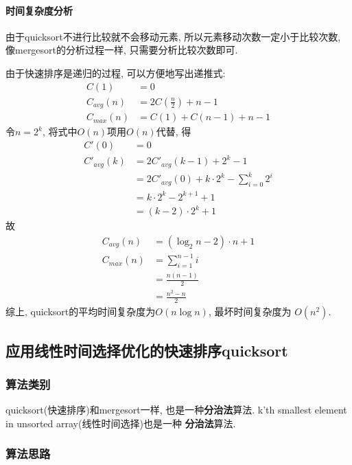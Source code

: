 \paragraph{时间复杂度分析}
由于quicksort不进行比较就不会移动元素, 所以元素移动次数一定小于比较次数,
像mergesort的分析过程一样, 只需要分析比较次数即可.\par
由于快速排序是递归的过程, 可以方便地写出递推式:
\begin{align}
	C(1)       & = 0                        \nonumber \\
	C_{avg}(n) & = 2C(\frac{n}{2}) + n - 1  \nonumber \\
	C_{max}(n) & = C(1) + C(n - 1) + n - 1  \nonumber
\end{align}
令\(n=2^k\), 将式中$O(n)$项用$O(n)$代替, 得
\begin{align}
	C'(0)       & = 0                                           \nonumber \\
	C'_{avg}(k) & = 2C'_{avg}(k-1)+2^k-1                        \nonumber \\
	            & = 2C'_{avg}(0)+k\cdot 2^k - \sum_{i=0}^k 2^i  \nonumber \\
	            & = k\cdot 2^k - 2^{k+1}+1                      \nonumber \\
	            & = (k-2)\cdot 2^k + 1 \nonumber
\end{align}
故
\begin{align}
	C_{avg}(n) & = (\log_2{n}-2)\cdot n+1  \nonumber \\
	C_{max}(n) & = \sum_{i=1}^{n-1}i       \nonumber \\
	           & = \frac{n(n-1)}{2}        \nonumber \\
	           & =\frac{n^2-n}{2}          \nonumber
\end{align}
综上, quicksort的平均时间复杂度为$O(n\log n)$, 最坏时间复杂度为
$O(n^2)$.

\subsection{应用线性时间选择优化的快速排序quicksort}
\subsubsection{算法类别}
quicksort(快速排序)和mergesort一样, 也是一种\textbf{分治法}算法.
k'th smallest element in unsorted array(线性时间选择)也是一种
\textbf{分治法}算法.

\subsubsection{算法思路}
